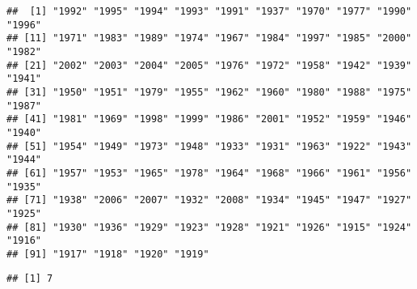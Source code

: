 \documentclass[
]{article}
\newenvironment{Shaded}{\begin{snugshade}}{\end{snugshade}}
\newcommand{\CharTok}[1]{\textcolor[rgb]{0.31,0.60,0.02}{#1}}
\newcommand{\CommentTok}[1]{\textcolor[rgb]{0.56,0.35,0.01}{\textit{#1}}}
\newcommand{\DecValTok}[1]{\textcolor[rgb]{0.00,0.00,0.81}{#1}}
\newcommand{\KeywordTok}[1]{\textcolor[rgb]{0.13,0.29,0.53}{\textbf{#1}}}
\newcommand{\NormalTok}[1]{#1}
\newcommand{\OperatorTok}[1]{\textcolor[rgb]{0.81,0.36,0.00}{\textbf{#1}}}
\newcommand{\StringTok}[1]{\textcolor[rgb]{0.31,0.60,0.02}{#1}}
\begin{document}
\begin{verbatim}
##  [1] "1992" "1995" "1994" "1993" "1991" "1937" "1970" "1977" "1990" "1996"
## [11] "1971" "1983" "1989" "1974" "1967" "1984" "1997" "1985" "2000" "1982"
## [21] "2002" "2003" "2004" "2005" "1976" "1972" "1958" "1942" "1939" "1941"
## [31] "1950" "1951" "1979" "1955" "1962" "1960" "1980" "1988" "1975" "1987"
## [41] "1981" "1969" "1998" "1999" "1986" "2001" "1952" "1959" "1946" "1940"
## [51] "1954" "1949" "1973" "1948" "1933" "1931" "1963" "1922" "1943" "1944"
## [61] "1957" "1953" "1965" "1978" "1964" "1968" "1966" "1961" "1956" "1935"
## [71] "1938" "2006" "2007" "1932" "2008" "1934" "1945" "1947" "1927" "1925"
## [81] "1930" "1936" "1929" "1923" "1928" "1921" "1926" "1915" "1924" "1916"
## [91] "1917" "1918" "1920" "1919"
\end{verbatim}

\begin{Shaded}
\end{Shaded}

\begin{verbatim}
## [1] 7
\end{verbatim}

\begin{Shaded}
\end{Shaded}
\end{document}
